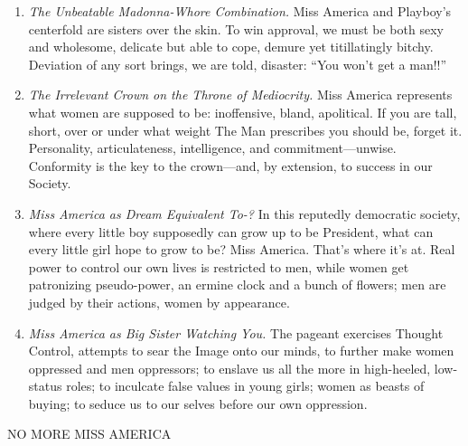 \documentclass{article}
\begin{document}
\begin{enumerate}
	\item \textit{The Unbeatable Madonna-Whore Combination.} Miss America and
		Playboy's centerfold are sisters over the skin. To win approval, we
		must be both sexy and wholesome, delicate but able to cope, demure yet
		titillatingly bitchy. Deviation of any sort brings, we are told,
		disaster: ``You won't get a man!!''

	\item \textit{The Irrelevant Crown on the Throne of Mediocrity.} Miss
		America represents what women are supposed to be: inoffensive, bland,
		apolitical. If you are tall, short, over or under what weight The Man
		prescribes you should be, forget it. Personality, articulateness,
		intelligence, and commitment---unwise. Conformity is the key to the
		crown---and, by extension, to success in our Society.

	\item \textit{Miss America as Dream Equivalent To-?} In this reputedly
		democratic society, where every little boy supposedly can grow up to be
		President, what can every little girl hope to grow to be? Miss America.
		That's where it's at. Real power to control our own lives is restricted
		to men, while women get patronizing pseudo-power, an ermine clock and a
		bunch of flowers; men are judged by their actions, women by appearance.

	\item \textit{Miss America as Big Sister Watching You.} The pageant
		exercises Thought Control, attempts to sear the Image onto our minds,
		to further make women oppressed and men oppressors; to enslave us all
		the more in high-heeled, low-status roles; to inculcate false values in
		young girls; women as beasts of buying; to seduce us to our selves
		before our own oppression.
\end{enumerate}

NO MORE MISS AMERICA
\end{document}
